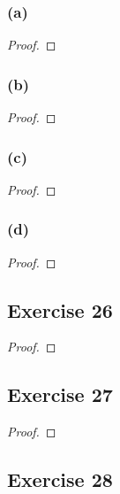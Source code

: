 \documentclass[14pt]{extarticle}
\begin{document}
\subsubsection{(a)}

\begin{proof}

\end{proof}

\subsubsection{(b)}

\begin{proof}

\end{proof}

\subsubsection{(c)}

\begin{proof}

\end{proof}

\subsubsection{(d)}

\begin{proof}

\end{proof}

\subsection{Exercise 26}

\begin{proof}

\end{proof}

\subsection{Exercise 27}

\begin{proof}

\end{proof}

\subsection{Exercise 28}
\end{document}
